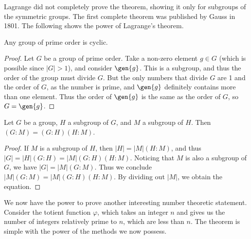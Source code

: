 Lagrange did not completely prove the theorem, showing it only for subgroups of the symmetric groups. The first complete theorem was published by Gauss in 1801. The following shows the power of Lagrange's theorem.

\begin{corollary} Any group of prime order is cyclic. \end{corollary}
\begin{proof}
    Let $G$ be a group of prime order. Take a non-zero element $g \in G$ (which is possible since $|G| > 1$), and consider $\gen{g}$. This is a subgroup, and thus the order of the group must divide $G$. But the only numbers that divide $G$ are 1 and the order of $G$, as the number is prime, and $\gen{g}$ definitely contains more than one element. Thus the order of $\gen{g}$ is the same as the order of $G$, so $G = \gen{g}$.
\end{proof}

\begin{corollary} 
    Let $G$ be a group, $H$ a subgroup of $G$, and $M$ a subgroup of $H$. Then $(G:M) = (G:H)(H:M)$.
\end{corollary}
\begin{proof}
    If $M$ is a subgroup of $H$, then $|H| = |M|(H:M)$, and thus $|G| = |H|(G:H) = |M|(G:H)(H:M)$. Noticing that $M$ is also a subgroup of $G$, we have $|G| = |M|(G:M)$. Thus we conclude $|M|(G:M) = |M|(G:H)(H:M)$. By dividing out $|M|$, we obtain the equation.
\end{proof}

We now have the power to prove another interesting number theoretic statement. Consider the totient function $\varphi$, which takes an integer $n$ and gives us the number of integers relatively prime to $n$, which are less than $n$. The theorem is simple with the power of the methods we now possess.

